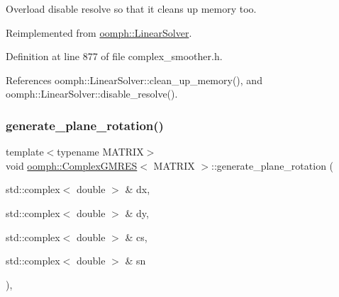 Overload disable resolve so that it cleans up memory too. 



Reimplemented from \hyperlink{classoomph_1_1LinearSolver_ad61c63af94c5961830bd9807225a48d6}{oomph\+::\+Linear\+Solver}.



Definition at line 877 of file complex\+\_\+smoother.\+h.



References oomph\+::\+Linear\+Solver\+::clean\+\_\+up\+\_\+memory(), and oomph\+::\+Linear\+Solver\+::disable\+\_\+resolve().

\mbox{\label{classoomph_1_1ComplexGMRES_a07183636586d7d30fcde380ef88e5fe6}} 
\subsubsection{\texorpdfstring{generate\+\_\+plane\+\_\+rotation()}{generate\_plane\_rotation()}}
{\footnotesize\ttfamily template$<$typename M\+A\+T\+R\+IX$>$ \\
void \hyperlink{classoomph_1_1ComplexGMRES}{oomph\+::\+Complex\+G\+M\+R\+ES}$<$ M\+A\+T\+R\+IX $>$\+::generate\+\_\+plane\+\_\+rotation (\begin{DoxyParamCaption}\item[{std\+::complex$<$ double $>$ \&}]{dx,  }\item[{std\+::complex$<$ double $>$ \&}]{dy,  }\item[{std\+::complex$<$ double $>$ \&}]{cs,  }\item[{std\+::complex$<$ double $>$ \&}]{sn }\end{DoxyParamCaption})\hspace{0.3cm}{\ttfamily [inline]}, {\ttfamily [private]}}



